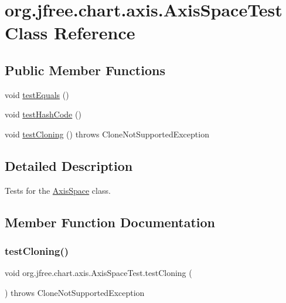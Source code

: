 \hypertarget{classorg_1_1jfree_1_1chart_1_1axis_1_1_axis_space_test}{}\section{org.\+jfree.\+chart.\+axis.\+Axis\+Space\+Test Class Reference}
\label{classorg_1_1jfree_1_1chart_1_1axis_1_1_axis_space_test}
\subsection*{Public Member Functions}
\begin{DoxyCompactItemize}
\item 
void \mbox{\hyperlink{classorg_1_1jfree_1_1chart_1_1axis_1_1_axis_space_test_a667e3d87f7e4db69a14fe3f9ed7e954e}{test\+Equals}} ()
\item 
void \mbox{\hyperlink{classorg_1_1jfree_1_1chart_1_1axis_1_1_axis_space_test_aa91b48cf00e26db70968cb5ad398553b}{test\+Hash\+Code}} ()
\item 
void \mbox{\hyperlink{classorg_1_1jfree_1_1chart_1_1axis_1_1_axis_space_test_a745ce9c87be30fc1122e2686069ae050}{test\+Cloning}} ()  throws Clone\+Not\+Supported\+Exception 
\end{DoxyCompactItemize}


\subsection{Detailed Description}
Tests for the \mbox{\hyperlink{classorg_1_1jfree_1_1chart_1_1axis_1_1_axis_space}{Axis\+Space}} class. 

\subsection{Member Function Documentation}
\mbox{\label{classorg_1_1jfree_1_1chart_1_1axis_1_1_axis_space_test_a745ce9c87be30fc1122e2686069ae050}} 
\subsubsection{\texorpdfstring{test\+Cloning()}{testCloning()}}
{\footnotesize\ttfamily void org.\+jfree.\+chart.\+axis.\+Axis\+Space\+Test.\+test\+Cloning (\begin{DoxyParamCaption}{ }\end{DoxyParamCaption}) throws Clone\+Not\+Supported\+Exception}

